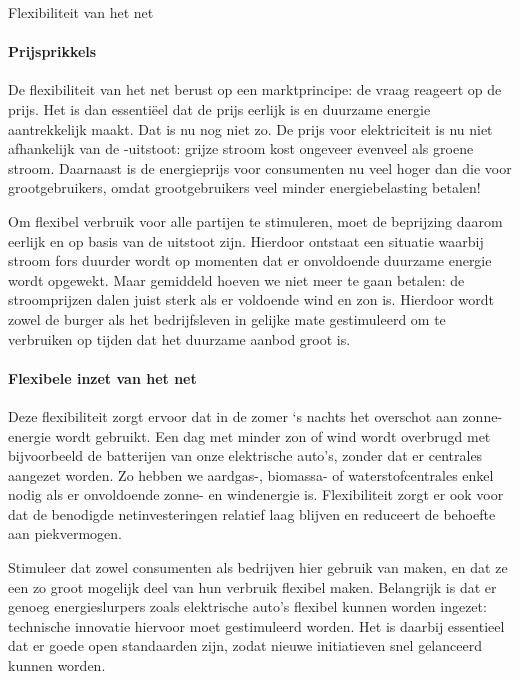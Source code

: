 \begin{voorstel}{Flexibiliteit van het net}
\begin{multicols*}{2}
\begin{overwegingen}
\paragraph{Prijsprikkels}
De flexibiliteit van het net berust op een marktprincipe: de vraag reageert op de prijs. Het is dan essentiëel dat de prijs eerlijk is en duurzame energie aantrekkelijk maakt. Dat is nu nog niet zo. De prijs voor elektriciteit is nu niet afhankelijk van de \COO-uitstoot: grijze stroom kost ongeveer evenveel als groene stroom. Daarnaast is de energieprijs voor consumenten nu veel hoger dan die voor grootgebruikers, omdat grootgebruikers veel minder energiebelasting betalen!

Om flexibel verbruik voor alle partijen te stimuleren, moet de beprijzing daarom eerlijk en op basis van de uitstoot zijn. Hierdoor ontstaat een situatie waarbij stroom fors duurder wordt op momenten dat er onvoldoende duurzame energie wordt opgewekt. Maar gemiddeld hoeven we niet meer te gaan betalen: de stroomprijzen dalen juist sterk als er voldoende wind en zon is. Hierdoor wordt zowel de burger als het bedrijfsleven in gelijke mate gestimuleerd om te verbruiken op tijden dat het duurzame aanbod groot is.

\paragraph{Flexibele inzet van het net}
Deze flexibiliteit zorgt ervoor dat in de zomer ‘s nachts het overschot aan zonne-energie wordt gebruikt. Een dag met minder zon of wind wordt overbrugd met bijvoorbeeld de batterijen van onze elektrische auto’s, zonder dat er centrales aangezet worden. Zo hebben we aardgas-, biomassa- of waterstofcentrales enkel nodig als er onvoldoende zonne- en windenergie is. Flexibiliteit zorgt er ook voor dat de benodigde netinvesteringen relatief laag blijven en reduceert de behoefte aan piekvermogen.

\end{overwegingen}

\begin{aanbevelingen}
Stimuleer dat zowel consumenten als bedrijven hier gebruik van maken, en dat ze een zo groot mogelijk deel van hun verbruik flexibel maken. Belangrijk is dat er genoeg energieslurpers zoals elektrische auto's flexibel kunnen worden ingezet: technische innovatie hiervoor moet gestimuleerd worden. Het is daarbij essentieel dat er goede open standaarden zijn, zodat nieuwe initiatieven snel gelanceerd kunnen worden.


\end{aanbevelingen}
\end{multicols*}
\end{voorstel}
